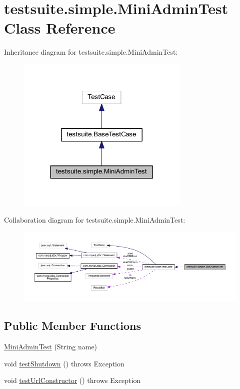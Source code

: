 \hypertarget{classtestsuite_1_1simple_1_1_mini_admin_test}{}\section{testsuite.\+simple.\+Mini\+Admin\+Test Class Reference}
\label{classtestsuite_1_1simple_1_1_mini_admin_test}


Inheritance diagram for testsuite.\+simple.\+Mini\+Admin\+Test\+:
\nopagebreak
\begin{figure}[H]
\begin{center}
\leavevmode
\includegraphics[width=233pt]{classtestsuite_1_1simple_1_1_mini_admin_test__inherit__graph}
\end{center}
\end{figure}


Collaboration diagram for testsuite.\+simple.\+Mini\+Admin\+Test\+:
\nopagebreak
\begin{figure}[H]
\begin{center}
\leavevmode
\includegraphics[width=350pt]{classtestsuite_1_1simple_1_1_mini_admin_test__coll__graph}
\end{center}
\end{figure}
\subsection*{Public Member Functions}
\begin{DoxyCompactItemize}
\item 
\mbox{\hyperlink{classtestsuite_1_1simple_1_1_mini_admin_test_a3a0ed00e5b6b2feb4b9a2102c94fac02}{Mini\+Admin\+Test}} (String name)
\item 
void \mbox{\hyperlink{classtestsuite_1_1simple_1_1_mini_admin_test_a8420a5f6bcd0ecfe1b716b8251899662}{test\+Shutdown}} ()  throws Exception 
\item 
void \mbox{\hyperlink{classtestsuite_1_1simple_1_1_mini_admin_test_ae7432a2cbcda8109289d6240fb07839c}{test\+Url\+Constructor}} ()  throws Exception 
\end{DoxyCompactItemize}
